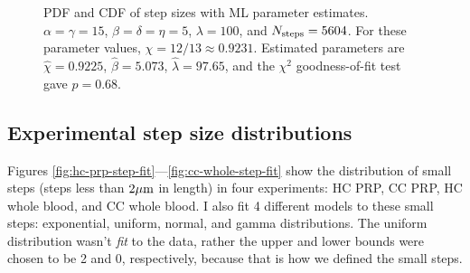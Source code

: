 \documentclass{article}
\newcommand{\tn}{\textnormal}
\begin{document}
\begin{figure}
  \centering
  \begin{subfigure}{0.48\textwidth}
  \end{subfigure}
  \hfill
  \begin{subfigure}{0.48\textwidth}
  \end{subfigure}
  \caption{PDF and CDF of step sizes with ML parameter
    estimates. $\alpha = \gamma = 15$, $\beta = \delta = \eta = 5$,
    $\lambda = 100$, and $N_\tn{steps} = 5604$. For these parameter
    values, $\chi = 12/13 \approx 0.9231$. Estimated parameters are
    $\hat{\chi} = 0.9225$, $\hat{\beta} = 5.073$,
    $\hat{\lambda} = 97.65$, and the $\chi^2$ goodness-of-fit test
    gave $p = 0.68$.}
  \label{fig:fit-cmp-large-a}  
\end{figure}

\subsection{Experimental step size distributions}
\label{sec:exper-step-size}

Figures \ref{fig:hc-prp-step-fit}---\ref{fig:cc-whole-step-fit} show
the distribution of small steps (steps less than $2 \mu\tn{m}$ in
length) in four experiments: HC PRP, CC PRP, HC whole blood, and CC
whole blood. I also fit 4 different models to these small steps:
exponential, uniform, normal, and gamma distributions. The uniform
distribution wasn't \emph{fit} to the data, rather the upper and lower
bounds were chosen to be 2 and 0, respectively, because that is how we
defined the small steps.
\end{document}
